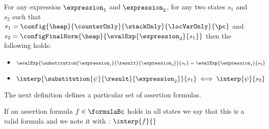 \begin{substRet}\label{substRet} 
For any expression $\expression_1$ and $\expression_2$,
for any two states $s_1$ and $s_2$  such that
$ s_1 =   \config{\heap}{\counterOnly}{ \stackOnly }{\locVarOnly}{\pc }$ and \\
$ s_2 =   \configFinalNorm{\heap}{\evalExp{\expression_2}{s_1} } $ then 
the following holds:
\begin{itemize}
      \item $\evalExp{\substitution{\expression_1}{ \result }{ \expression_2 }}{ s_1 } = \evalExp{\expression_1}{s_2} $
      \item $\interp{\substitution{\psi}{ \result}{ \expression_2 }}{ s_1 } \iff \interp{\psi}{s_2} $
\end{itemize}
\end{substRet}


The next definition defines a particular set of assertion formulas.
\begin{valid}
  If an assertion formula  $ f \in \formulaBc $ holds in all states we say that this is a valid formula and we note it with :
  $ \interp{f}{}$
\end{valid}
